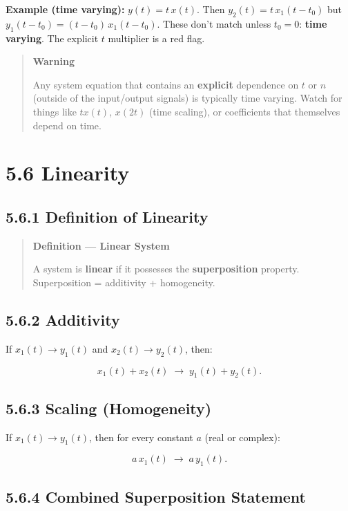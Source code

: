 \documentclass[11pt]{article}
\begin{document}
\textbf{Example (time varying):} $y(t) = t\,x(t)$.
Then $y_2(t) = t\,x_1(t-t_0)$ but $y_1(t-t_0) = (t-t_0)\,x_1(t-t_0)$. These don't match unless $t_0 = 0$: \textbf{time varying}. The explicit $t$ multiplier is a red flag.

\begin{quote}
\textbf{Warning}

Any system equation that contains an \textbf{explicit} dependence on $t$ or $n$ (outside of the input/output signals) is typically time varying. Watch for things like $t x(t)$, $x(2t)$ (time scaling), or coefficients that themselves depend on time.
\end{quote}

\section*{5.6 Linearity}

\subsection*{5.6.1 Definition of Linearity}

\begin{quote}
\textbf{Definition — Linear System}

A system is \textbf{linear} if it possesses the \textbf{superposition} property. Superposition = additivity + homogeneity.
\end{quote}

\subsection*{5.6.2 Additivity}

If $x_1(t) \to y_1(t)$ and $x_2(t) \to y_2(t)$, then:

\[x_1(t) + x_2(t) \;\longrightarrow\; y_1(t) + y_2(t).\]

\subsection*{5.6.3 Scaling (Homogeneity)}

If $x_1(t) \to y_1(t)$, then for every constant $a$ (real or complex):

\[a\,x_1(t) \;\longrightarrow\; a\,y_1(t).\]

\subsection*{5.6.4 Combined Superposition Statement}
\end{document}
